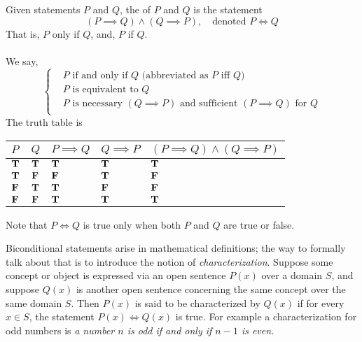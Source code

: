 \begin{definition}[Biconditional]
Given statements $P$ and $Q$, the  of $P$ and $Q$ is the statement \[(P \implies Q) \wedge (Q \implies P),\quad \text{denoted $P \iff Q$}\]
That is, $P$ only if $Q$, and, $P$ if $Q$.\\
\\
We say,
\begin{equation*}
  \left\{\begin{aligned}
  &\text{$P$ if and only if $Q$ (abbreviated as $P$ iff $Q$)}\\[0.5em]
  &\text{$P$ is equivalent to $Q$}\\[0.5em]
  &\text{$P$ is necessary $(Q \implies P)$ and sufficient $(P \implies Q)$ for $Q$}\\ 
\end{aligned}\right.
\end{equation*}
The truth table is
\begin{center}
{\renewcommand{\arraystretch}{1.5}%
\begin{tabular}{|>{\centering}m{1cm}|>{\centering}m{1cm}|>{\centering}m{1.5cm}|>{\centering}m{1.5cm}|>{\centering\arraybackslash}m{3.75cm}|}
\hline
\rowcolor{lightgrey}
$P$ & $Q$ & $P \implies Q$ & $Q \implies P$ & $(P \implies Q) \wedge (Q \implies P)$\\
\hline
$\mathbf{T}$ & $\mathbf{T}$ & $\mathbf{T}$ & $\mathbf{T}$ & $\mathbf{T}$\\
\hline
$\mathbf{T}$ & $\mathbf{F}$ & $\mathbf{F}$ & $\mathbf{T}$ & $\mathbf{F}$\\
\hline
$\mathbf{F}$ & $\mathbf{T}$ & $\mathbf{T}$ & $\mathbf{F}$ & $\mathbf{F}$\\
\hline
$\mathbf{F}$ & $\mathbf{F}$ & $\mathbf{T}$ & $\mathbf{T}$ & $\mathbf{T}$\\
\hline
\end{tabular}
}
\end{center}
\vspace*{1em}
Note that $P \iff Q$ is true only when both $P$ and $Q$ are true or false.
\end{definition}


\begin{remark}
Biconditional statements arise in mathematical definitions; the way to formally talk about that is to introduce the notion of \emph{characterization}. Suppose some concept or object is expressed via an open sentence $P(x)$ over a domain $S$, and suppose $Q(x)$ is another open sentence concerning the same concept over the same domain $S$. Then $P(x)$ is said to be characterized by $Q(x)$ if for every $x\in S$, the statement $P(x) \iff Q(x)$ is true. For example a characterization for odd numbers is \emph{a number $n$ is odd if and only if $n-1$ is even.}
\end{remark}

